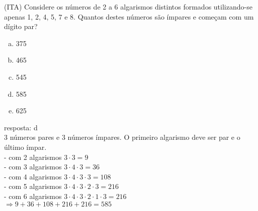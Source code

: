 \begin{ex}
  (ITA)  Considere os números de 2 a 6 algarismos distintos formados utilizando-se apenas 1, 2, 4, 5, 7 e 8. Quantos destes números são ímpares e começam com um dígito par?
    \begin{enumerate} [(a)]
     \item 375
     \item 465
     \item 545
     \item 585
     \item 625
     \end{enumerate}
       \begin{sol}
        resposta: d \\
        3 números pares e 3 números ímpares. O primeiro algarismo deve ser par e o último ímpar. \\
        - com 2 algarismos \hspace{0,3cm} $3\cdot3=9$  \\
        - com 3 algarismos \hspace{0,3cm} $3\cdot4\cdot3=36$ \\
        - com 4 algarismos \hspace{0,3cm} $3\cdot4\cdot3\cdot3=108$\\
        - com 5 algarismos \hspace{0,3cm} $3\cdot4\cdot3\cdot2\cdot3=216$\\
        - com 6 algarismos \hspace{0,3cm} $3\cdot4\cdot3\cdot2\cdot1\cdot3=216$ \\
        $\Longrightarrow 9+36+108+216+216=585$
       \end{sol}
  \end{ex}